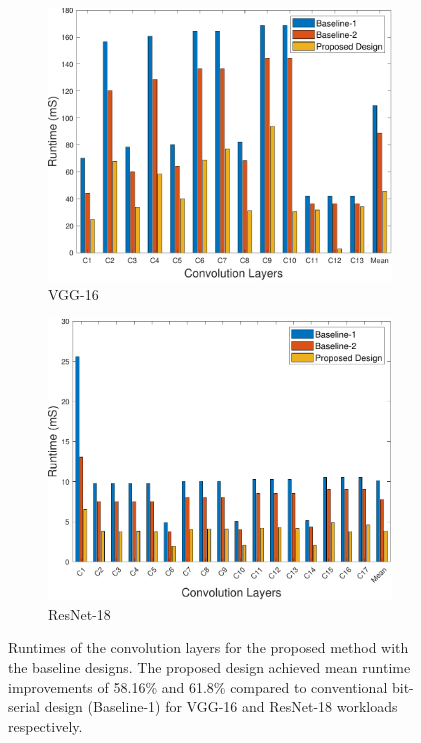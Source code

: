 \documentclass[conference]{IEEEtran}
\begin{document}
\begin{figure}
     \centering
     \begin{subfigure}[b]{\linewidth}
         \centering
         \includegraphics[width=\linewidth]{VGG_duration.pdf}
         \caption{VGG-16}
         \label{fig:runtime_VGG}
     \end{subfigure}
     \hfill
     \begin{subfigure}[b]{\linewidth}
         \centering
         \includegraphics[width=\linewidth]{ResNet_duration.pdf}
         \caption{ResNet-18}
         \label{fig:runtime_ResNet}
     \end{subfigure}
     \caption{Runtimes of the convolution layers for the proposed method with the baseline designs. The proposed design achieved mean runtime improvements of 58.16\% and 61.8\% compared to conventional bit-serial design (Baseline-1) for VGG-16 and ResNet-18 workloads respectively.}
     \label{fig:runtimes}
\end{figure}
\end{document}

